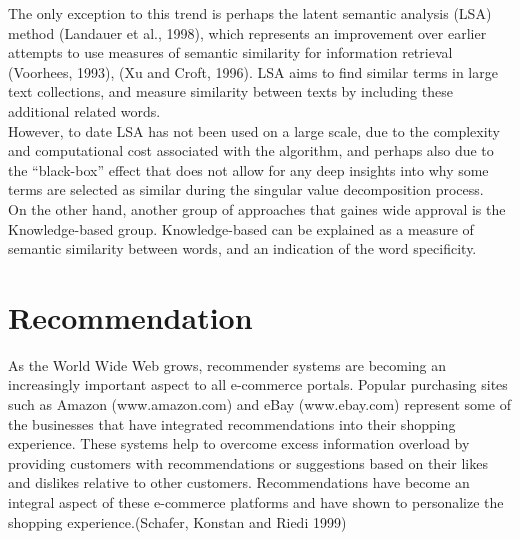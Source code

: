 The only exception to this trend is perhaps the latent semantic analysis (LSA) method (Landauer et al., 1998), which represents an improvement over earlier attempts to use measures of semantic similarity for information retrieval (Voorhees, 1993), (Xu and Croft, 1996). LSA aims to find similar terms in large text collections, and measure similarity between texts by including these additional related words. \\
However, to date LSA has not been used on a large scale, due to the complexity and computational cost associated with the algorithm, and perhaps also due to the “black-box” effect that does not allow for any deep insights into why some terms are selected as similar during the singular value decomposition process.\\

On the other hand, another group of approaches that gaines wide approval is the Knowledge-based group. Knowledge-based can be explained as a measure of semantic similarity between words, and an indication of the word specificity.\\

\section{Recommendation}
As the World Wide Web grows, recommender systems are becoming an increasingly important aspect to all e-commerce portals. Popular purchasing sites such as Amazon (www.amazon.com) and eBay (www.ebay.com) represent some of the businesses that have integrated recommendations into their shopping experience. These systems help to overcome excess information overload by providing customers with recommendations or suggestions based on their likes and dislikes relative to other customers.
Recommendations have become an integral aspect of these e-commerce platforms and have shown to personalize the shopping experience.(Schafer, Konstan and Riedi 1999) 
